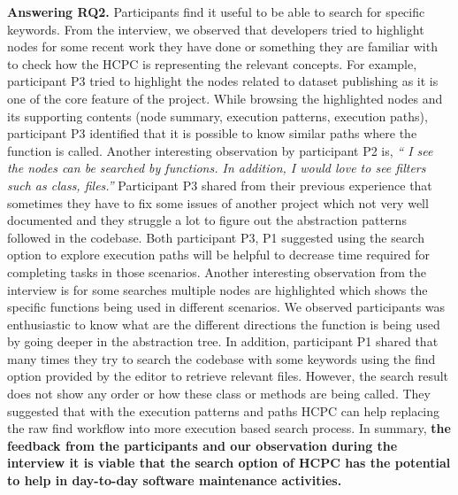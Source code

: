 \textbf{Answering RQ2.} Participants find it useful to be able to search for specific keywords. From the interview, we observed that developers tried to highlight nodes for some recent work they have done or something they are familiar with to check how the HCPC is representing the relevant concepts. For example, participant P3 tried to highlight the nodes related to dataset publishing as it is one of the core feature of the project. While browsing the highlighted nodes and its supporting contents (node summary, execution patterns, execution paths), participant P3 identified that it is possible to know similar paths where the function is called. Another interesting observation by participant P2 is, \emph{`` I see the nodes can be searched by functions. In addition, I would love to see filters such as class, files.''} Participant P3 shared from their previous experience that sometimes they have to fix some issues of another project which not very well documented and they struggle a lot to figure out the abstraction patterns followed in the codebase. Both participant P3, P1 suggested using the search option to explore execution paths will be helpful to decrease time required for completing tasks in those scenarios. Another interesting observation from the interview is for some searches multiple nodes are highlighted which shows the specific functions being used in different scenarios. We observed participants was enthusiastic to know what are the different directions the function is being used by going deeper in the abstraction tree. In addition, participant P1 shared that many times they try to search the codebase with some keywords using the find option provided by the editor to retrieve relevant files. However, the search result does not show any order or how these class or methods are being called. They suggested that with the execution patterns and paths HCPC can help replacing the raw find workflow into more execution based search process. In summary, \textbf{the feedback from the participants and our observation during the interview it is viable that the search option of  HCPC has the potential to help in day-to-day software maintenance activities. } 


